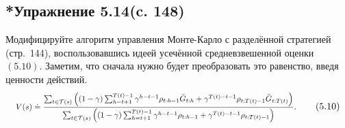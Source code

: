 \subsection{*Упражнение 5.14(c. 148)}
Модифицируйте алгоритм управления Монте-Карло с разделённой стратегией (стр.~144), воспользовавшись идеей усечённой средневзвешенной оценки $(5.10)$. Заметим, что сначала нужно будет преобразовать это равенство, введя ценности действий.
\begin{equation}
    \resizebox{0.85\linewidth}{!}{$\displaystyle V(s) \doteq \frac{\sum_{t \in \mathcal{T}(s)} \left((1-\gamma)\sum_{h=t+1}^{T(t)-1} \gamma^{h-t-1} \rho_{t:h-1} \bar{G}_{t:h} + \gamma^{T(t)-t-1} \rho_{t:T(t)-1} \bar{G}_{t:T(t)}\right)}{\sum_{t \in \mathcal{T}(s)} \left((1-\gamma)\sum_{h=t+1}^{T(t)-1} \gamma^{h-t-1} \rho_{t:h-1} + \gamma^{T(t)-t-1} \rho_{t:T(t)-1}\right)}. $}
    \tag{5.10}
\end{equation}
